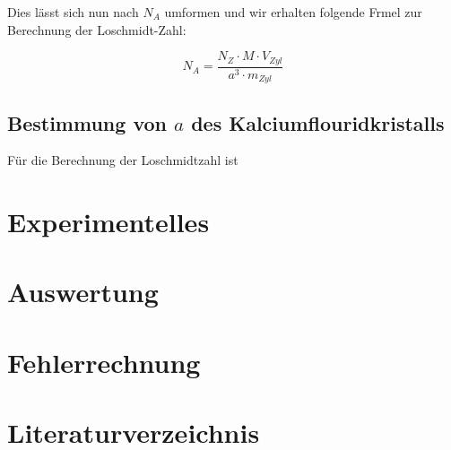 \documentclass[12pt,a4paper,titlepage,headinclude,bibtotoc]{scrartcl}
\begin{document}
Dies lässt sich nun nach $N_A$ umformen und wir erhalten folgende Frmel zur Berechnung der Loschmidt-Zahl:

\begin{equation}
N_A= \frac{N_Z \cdot M \cdot V_{Zyl}}{a^3 \cdot m_{Zyl}}
\end{equation}

\subsection{Bestimmung von $a$ des Kalciumflouridkristalls}
 
Für die Berechnung der Loschmidtzahl ist  


\section{Experimentelles}
\section{Auswertung}
\section{Fehlerrechnung}
\section{Literaturverzeichnis}
\end{document}
